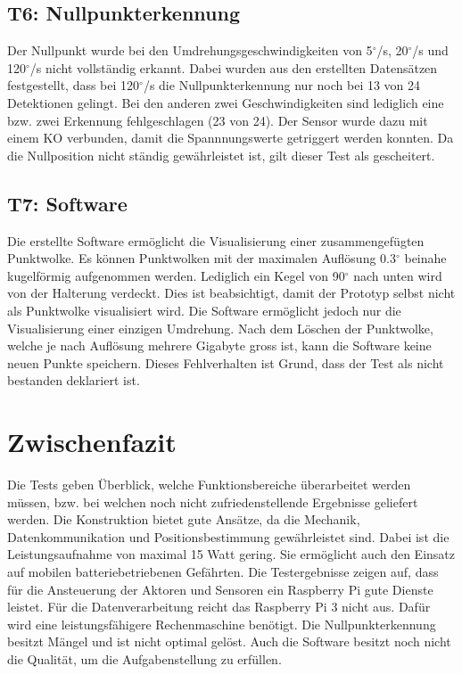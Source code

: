 \subsection {T6: Nullpunkterkennung}
\label{subsec:testSNullpunkterkennung}
Der Nullpunkt wurde bei den Umdrehungsgeschwindigkeiten von 5$^\circ$/s, 20$^\circ$/s und 120$^\circ$/s nicht vollständig erkannt. Dabei wurden aus den erstellten Datensätzen festgestellt, dass bei 120$^\circ$/s die Nullpunkterkennung nur noch bei 13 von 24 Detektionen gelingt. Bei den anderen zwei Geschwindigkeiten sind lediglich eine bzw. zwei Erkennung fehlgeschlagen (23 von 24). Der Sensor wurde dazu mit einem KO verbunden, damit die Spannnungswerte getriggert werden konnten. Da die Nullposition nicht ständig gewährleistet ist, gilt dieser Test als gescheitert.

\subsection {T7: Software}
\label{subsec:testSoftware}
Die erstellte Software ermöglicht die Visualisierung einer zusammengefügten Punktwolke. Es können Punktwolken mit der maximalen Auflösung 0.3$^\circ$ beinahe kugelförmig aufgenommen werden. Lediglich ein Kegel von 90$^\circ$ nach unten wird von der Halterung verdeckt. Dies ist beabsichtigt, damit der Prototyp selbst nicht als Punktwolke visualisiert wird. Die Software ermöglicht jedoch nur die Visualisierung einer einzigen Umdrehung. Nach dem Löschen der Punktwolke, welche je nach Auflösung mehrere Gigabyte gross ist, kann die Software keine neuen Punkte speichern. Dieses Fehlverhalten ist Grund, dass der Test als nicht bestanden deklariert ist.

\section{Zwischenfazit}
\label{sec:Fazit}
Die Tests geben Überblick, welche Funktionsbereiche überarbeitet werden müssen, bzw. bei welchen noch nicht zufriedenstellende Ergebnisse geliefert werden.
Die Konstruktion bietet gute Ansätze, da die Mechanik, Datenkommunikation und Positionsbestimmung gewährleistet sind. Dabei ist die Leistungsaufnahme von maximal 15 Watt gering. Sie ermöglicht auch den Einsatz auf mobilen batteriebetriebenen Gefährten. Die Testergebnisse zeigen auf, dass für die Ansteuerung der Aktoren und Sensoren ein Raspberry Pi gute Dienste leistet. Für die Datenverarbeitung reicht das Raspberry Pi 3 nicht aus. Dafür wird eine leistungsfähigere Rechenmaschine benötigt. Die Nullpunkterkennung besitzt Mängel und ist nicht optimal gelöst. Auch die Software besitzt noch nicht die Qualität, um die Aufgabenstellung zu erfüllen.    